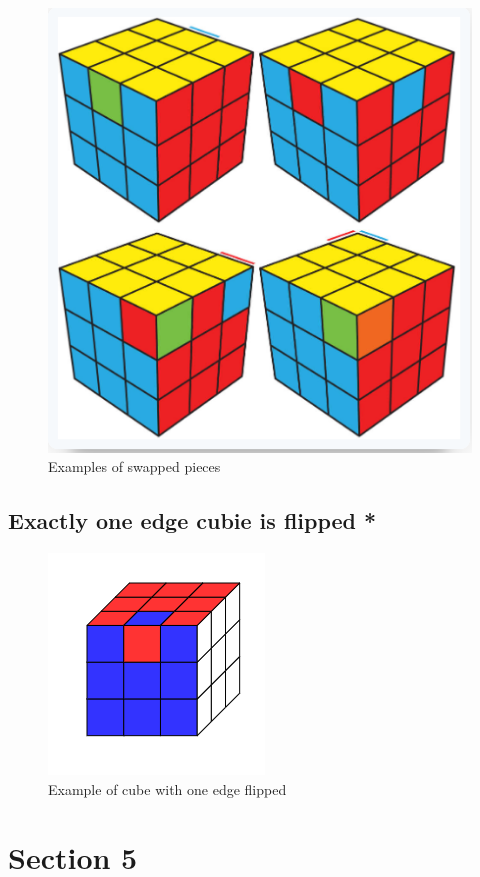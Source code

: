 \begin{figure}
\centering
\includegraphics{Screenshot from 2024-03-24 08-42-10-1.png}
\caption{Examples of swapped pieces}
\end{figure}

\subsection{Exactly one edge cubie is flipped
*}\label{exactly-one-edge-cubie-is-flipped}

\begin{figure}
\centering
\includegraphics{Screenshot from 2024-03-26 11-14-42-1.png}
\caption{Example of cube with one edge flipped}
\end{figure}

\section{Section 5}\label{section-5}

